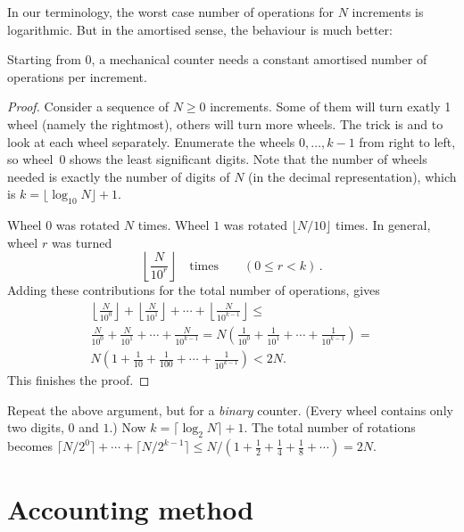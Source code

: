\documentclass{tstextbook}
\begin{document}
In our terminology, the worst case number of operations for $N$
increments is logarithmic. But in the amortised sense, the behaviour
is much better:

\begin{theorem}
    Starting from 0, a mechanical counter needs a
  constant amortised number of operations per increment.
\end{theorem}

\begin{proof}
Consider a sequence of $N\geq 0$ increments. 
  Some of them will turn exatly 1 wheel (namely the rightmost), others will turn more wheels.
  The trick is and to look at each wheel separately.
  Enumerate the  wheels $0,\ldots, k-1$ from right to left, so wheel~$0$ shows the least significant digits.  
  Note that the number of wheels needed is exactly the number of digits of $N$ (in the decimal representation), which is  $k=\lfloor \log_{10} N\rfloor + 1$.

Wheel $0$ was rotated $N$ times. 
  Wheel $1$ was rotated $\lfloor N/10\rfloor$ times.
  In general, wheel $r$ was turned \[ \left \lfloor \frac{N}{10^r} \right\rfloor\quad\text{times}\qquad (0\leq r < k)\,.\]
  Adding these contributions for the total number of operations, gives 
\begin{multline*}
 \left \lfloor
\frac{N}{10^0} \right\rfloor +
 \left \lfloor
\frac{N}{10^1} \right\rfloor +
\cdots +
 \left \lfloor
\frac{N}{10^{k-1}} \right\rfloor
\leq \\
\frac{N}{10^0} +
\frac{N}{10^1} +
\cdots +
\frac{N}{10^{k-1}} 
  =
N\left(\frac{1}{10^0}+\frac{1}{10^1}+\cdots+\frac{1}{10^{k-1}} \right) =\\
  N\left(1 + \frac{1}{10} + \frac{1}{100} + \cdots +\frac{1}{10^{k-1}} \right)
< 2N.
\end{multline*}
This finishes the proof.
\end{proof}

\begin{ExerciseList}
  \Exercise{}
  Repeat the above argument, but for a \emph{binary} counter.
  (Every wheel contains only two digits, $0$ and $1$.)
  \Answer
  Now $k=\lceil \log_2 N\rceil + 1$.
  The total number of rotations becomes $\lceil N/2^0\rceil+ \cdots+ \lceil N/2^{k-1}\rceil  \leq N/(1 + \frac12 + \frac14 + \frac18 +\cdots )= 2N$. 
\end{ExerciseList}

\section{Accounting method}
\end{document}
